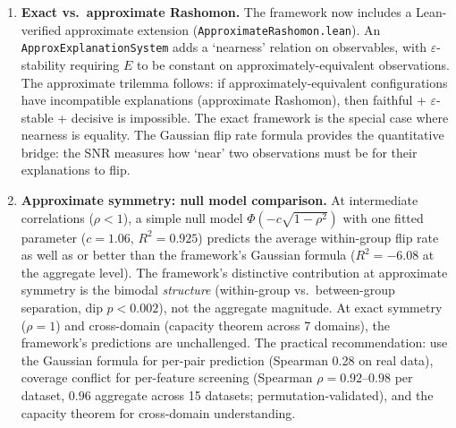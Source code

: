\documentclass[11pt,a4paper]{article}
\begin{document}
\begin{enumerate}[label=(\arabic*)]
    (all pairs achievable by degenerate classifiers); at $\tau \geq 0.3$ (practical
    performance: TPR $\geq 30\%$ for both groups), the tightness transitions to
    PPV-blocked---calibration becomes a universal poison, individually incompatible
    with both equal FPR and equal FNR.  The only achievable pairwise compromise at
    practical performance is equalized odds (gap $< 0.006$).  Validated on Adult
    Income (sex as protected attribute, base-rate gap 0.20) and synthetic data
    (gap 0.25, 0.40), with bootstrap retraining (20 iterations, 100\% stable).
    This changes the practical recommendation from ``choose a fairness criterion''
    to ``equalized odds is the only achievable criterion at practical performance;
    calibration is structurally incompatible.''
  \item \textbf{Exact vs.\ approximate Rashomon.}  The framework now includes a Lean-verified approximate extension (\texttt{ApproximateRashomon.lean}).  An \texttt{ApproxExplanationSystem} adds a `nearness' relation on observables, with $\varepsilon$-stability requiring $E$ to be constant on approximately-equivalent observations.  The approximate trilemma follows: if approximately-equivalent configurations have incompatible explanations (approximate Rashomon), then faithful + $\varepsilon$-stable + decisive is impossible.  The exact framework is the special case where nearness is equality.  The Gaussian flip rate formula provides the quantitative bridge: the SNR measures how `near' two observations must be for their explanations to flip.
  \item \textbf{Approximate symmetry: null model comparison.}
    At intermediate correlations ($\rho < 1$), a simple null model $\Phi(-c\sqrt{1-\rho^2})$ with one fitted parameter ($c = 1.06$, $R^2 = 0.925$) predicts the average within-group flip rate as well as or better than the framework's Gaussian formula ($R^2 = -6.08$ at the aggregate level). The framework's distinctive contribution at approximate symmetry is the bimodal \emph{structure} (within-group vs.\ between-group separation, dip $p < 0.002$), not the aggregate magnitude. At exact symmetry ($\rho = 1$) and cross-domain (capacity theorem across 7 domains), the framework's predictions are unchallenged. The practical recommendation: use the Gaussian formula for per-pair prediction (Spearman 0.28 on real data), coverage conflict for per-feature screening (Spearman $\rho = 0.92$--$0.98$ per dataset, $0.96$ aggregate across 15 datasets; permutation-validated), and the capacity theorem for cross-domain understanding.

\end{enumerate}
\end{document}
